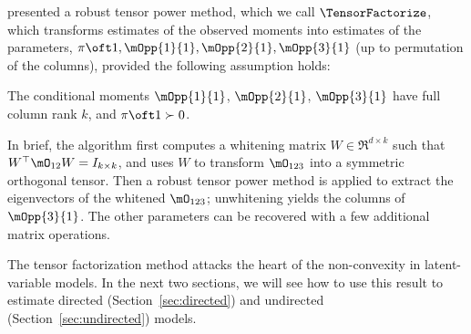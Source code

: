 \citet{anandkumar13tensor} presented a robust tensor power method, which
  we call $\TensorFactorize$, which transforms estimates of the observed moments 
  into estimates of the parameters, $\pi\oft 1, \mOpp{1}{1},
  \mOpp{2}{1},\mOpp{3}{1}$ (up to permutation of the columns), provided
  the following assumption holds:

\begin{assumption}
\label{asm:full-rank}
The conditional moments $\mOpp{1}{1}$, $\mOpp{2}{1}$, $\mOpp{3}{1}$ have full column rank
  $k$, and $\pi\oft 1 \succ 0$.
\end{assumption}

In brief, the algorithm first computes a whitening matrix $W \in
  \Re^{d \times k}$ such that $W^\top \mO_{12} W = I_{k \times k}$,
  and uses $W$ to transform $\mO_{123}$ into a symmetric orthogonal tensor.  
Then a robust tensor power method is applied to extract the eigenvectors
of the whitened $\mO_{123}$; unwhitening yields the columns of $\mOpp{3}{1}$.
The other parameters can be recovered with a few additional matrix operations.

The tensor factorization method attacks the heart of the non-convexity
  in latent-variable models.  In the next two sections,
  we will see how to use this result to estimate directed (Section~\ref{sec:directed})
  and undirected (Section~\ref{sec:undirected}) models.

